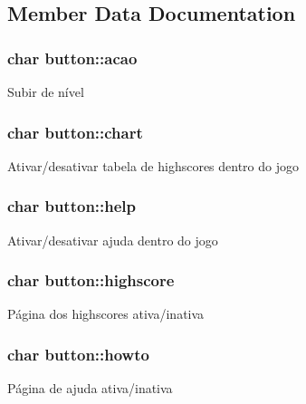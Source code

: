 \subsection{Member Data Documentation}
\subsubsection[{\texorpdfstring{acao}{acao}}]{\setlength{\rightskip}{0pt plus 5cm}char button\+::acao}\hypertarget{structbutton_ad914404cfbc8f53485a9bbf08162c9d1}{}\label{structbutton_ad914404cfbc8f53485a9bbf08162c9d1}
Subir de nível 
\subsubsection[{\texorpdfstring{chart}{chart}}]{\setlength{\rightskip}{0pt plus 5cm}char button\+::chart}\hypertarget{structbutton_a77b091561b8c671e3330fa42e7f5b1fb}{}\label{structbutton_a77b091561b8c671e3330fa42e7f5b1fb}
Ativar/desativar tabela de highscores dentro do jogo 
\subsubsection[{\texorpdfstring{help}{help}}]{\setlength{\rightskip}{0pt plus 5cm}char button\+::help}\hypertarget{structbutton_a02ed4060db18a4379dfd33b390ec2b26}{}\label{structbutton_a02ed4060db18a4379dfd33b390ec2b26}
Ativar/desativar ajuda dentro do jogo 
\subsubsection[{\texorpdfstring{highscore}{highscore}}]{\setlength{\rightskip}{0pt plus 5cm}char button\+::highscore}\hypertarget{structbutton_a8f6b8a8fe70bb20cf466c78ae9105f99}{}\label{structbutton_a8f6b8a8fe70bb20cf466c78ae9105f99}
Página dos highscores ativa/inativa 
\subsubsection[{\texorpdfstring{howto}{howto}}]{\setlength{\rightskip}{0pt plus 5cm}char button\+::howto}\hypertarget{structbutton_abe1ea44fec6f7b4c30066154cf65cc90}{}\label{structbutton_abe1ea44fec6f7b4c30066154cf65cc90}
Página de ajuda ativa/inativa 
